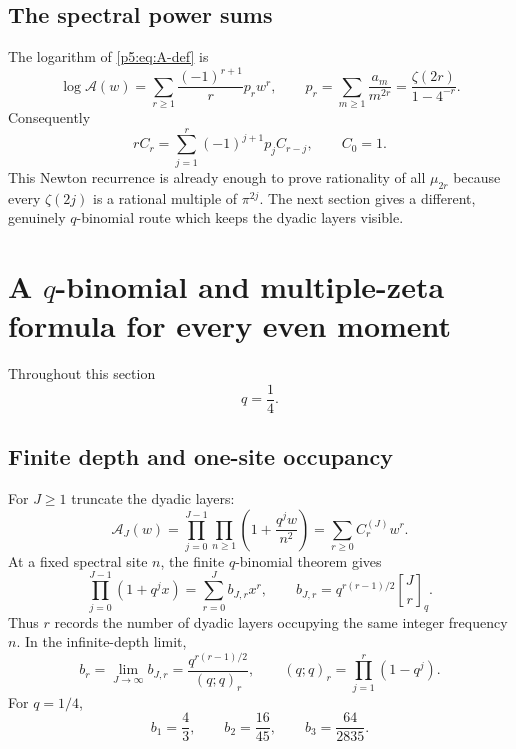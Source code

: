 \documentclass[11pt]{article}
\numberwithin{equation}{section}
\theoremstyle{definition}
\theoremstyle{remark}
\newcommand{\qbinom}[3]{\genfrac{[}{]}{0pt}{}{#1}{#2}_{#3}}
\begin{document}
\subsection{The spectral power sums}

The logarithm of \cref{p5:eq:A-def} is
\begin{equation}\label{p5:eq:logA-power}
 \log\mathcal A(w)
 =\sum_{r\ge1}\frac{(-1)^{r+1}}r p_rw^r,
 \qquad
 p_r=\sum_{m\ge1}\frac{a_m}{m^{2r}}
 =\frac{\zeta(2r)}{1-4^{-r}}.
\end{equation}
Consequently
\begin{equation}\label{p5:eq:C-recurrence}
 rC_r=\sum_{j=1}^{r}(-1)^{j+1}p_jC_{r-j},\qquad C_0=1.
\end{equation}
This Newton recurrence is already enough to prove rationality of all
$\mu_{2r}$ because every $\zeta(2j)$ is a rational multiple of $\pi^{2j}$.
The next section gives a different, genuinely $q$-binomial route which keeps
the dyadic layers visible.

\section{A $q$-binomial and multiple-zeta formula for every even moment}

Throughout this section
\begin{equation}\label{p5:eq:q-def}
 q=\frac14.
\end{equation}

\subsection{Finite depth and one-site occupancy}

For $J\ge1$ truncate the dyadic layers:
\begin{equation}\label{p5:eq:AJ-def}
 \mathcal A_J(w)=\prod_{j=0}^{J-1}\prod_{n\ge1}
 \left(1+\frac{q^jw}{n^2}\right)
 =\sum_{r\ge0}C_r^{(J)}w^r.
\end{equation}
At a fixed spectral site $n$, the finite $q$-binomial theorem gives
\begin{equation}\label{p5:eq:finite-qbinom}
 \prod_{j=0}^{J-1}(1+q^jx)
 =\sum_{r=0}^{J}b_{J,r}x^r,
 \qquad
 b_{J,r}=q^{r(r-1)/2}\qbinom{J}{r}{q}.
\end{equation}
Thus $r$ records the number of dyadic layers occupying the same integer
frequency $n$.  In the infinite-depth limit,
\begin{equation}\label{p5:eq:b-infty}
 b_r=\lim_{J\to\infty}b_{J,r}
 =\frac{q^{r(r-1)/2}}{(q;q)_r},
 \qquad (q;q)_r=\prod_{j=1}^{r}(1-q^j).
\end{equation}
For $q=1/4$,
\begin{equation}\label{p5:eq:b-first}
 b_1=\frac43,\qquad b_2=\frac{16}{45},\qquad
 b_3=\frac{64}{2835}.
\end{equation}
\end{document}
